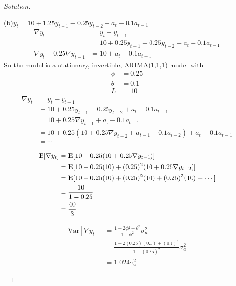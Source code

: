 \documentclass[UTF8,a4paper,14pt]{ctexart}
\newcommand{\E}{{\rm I\kern-.3em E}}
\newcommand{\Var}{\mathrm{Var}}
\newenvironment{solution}
  {\renewcommand\qedsymbol{$\blacksquare$}\begin{proof}[Solution]}
  {\end{proof}}
\theoremstyle{definition}
\theoremstyle{remark}
\begin{document}
\begin{solution}
  \begin{mybox}{(b)\(y_t = 10+1.25y_{t-1}-0.25y_{t-2}+a_t-0.1a_{t-1}\)}
    \begin{equation*}
      \begin{aligned}
        \nabla y_t 
        &= y_t-y_{t-1}\\
        &=10+0.25y_{t-1}-0.25y_{t-2}+a_t-0.1a_{t-1}\\
        \nabla y_t -0.25\nabla y_{t-1}&=10+a_t-0.1a_{t-1}
      \end{aligned}
    \end{equation*}
    So the model is a stationary, invertible, ARIMA(1,1,1) model with 
        \begin{equation*}
      \begin{aligned}
        \phi &= 0.25\\
        \theta &= 0.1\\
        L &= 10
      \end{aligned}
    \end{equation*}
    \begin{equation*}
      \begin{aligned}
        \nabla y_t 
        &= y_t-y_{t-1}\\
        &=10+0.25y_{t-1}-0.25y_{t-2}+a_t-0.1a_{t-1}\\
        &=10+0.25 \nabla y_{t-1}+a_t-0.1a_{t-1}\\
        &=10+0.25 (10+0.25 \nabla y_{t-2}+a_{t-1}-0.1a_{t-2})+a_t-0.1a_{t-1}\\
        &=\cdots
      \end{aligned}
    \end{equation*}



    \tcbsubtitle{\(\E[\nabla y_t ]\)} 
    
    \begin{equation*}
      \begin{aligned}
        \E[\nabla y_t ]
        &= \E[10+0.25(10+0.25\nabla y_{t-1})]\\
        &= \E[10+0.25(10)+(0.25)^2(10+0.25\nabla y_{t-2})]\\
        &= \E[10+0.25(10)+(0.25)^2(10)+(0.25)^3(10)+\cdots]\\
        &=\frac{10}{1-0.25}\\
        &=\frac{40}{3}
      \end{aligned}
    \end{equation*}
    
    \tcbsubtitle{\(\Var[\nabla y_t ]\)}         
    \begin{equation*}
      \begin{aligned}
        \Var[\nabla y_t ]
        &= \frac{1-2\phi\theta+\theta^2}{1-\phi^2}\sigma_a^2\\
        &= \frac{1-2(0.25)(0.1)+(0.1)^2}{1-(0.25)^2}\sigma_a^2\\
        &=1.024\sigma_a^2
      \end{aligned}
    \end{equation*}
  \end{mybox}



\end{solution}
\end{document}
